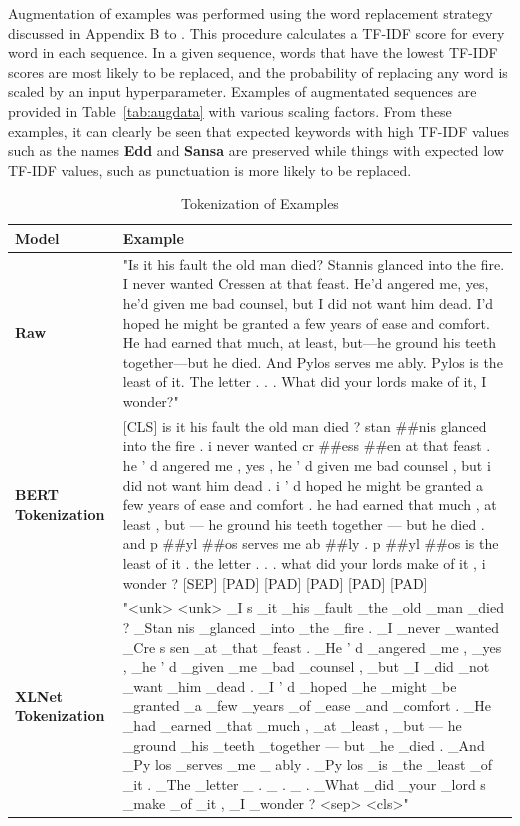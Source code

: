 \documentclass[twoside,twocolumn,10pt]{article}
\begin{document}
Augmentation of examples was performed using the word replacement strategy discussed in Appendix B to \cite{Xie:2019}.  This procedure calculates a TF-IDF score for every word in each sequence. In a given sequence, words that have the lowest TF-IDF scores are most likely to be replaced, and the probability of replacing any word is scaled by an input hyperparameter.  Examples of augmentated sequences are provided in Table~\ref{tab:augdata} with various scaling factors. From these examples, it can clearly be seen that expected keywords with high TF-IDF values such as the names \textbf{Edd} and \textbf{Sansa} are preserved while things with expected low TF-IDF values, such as punctuation is more likely to be replaced.  

\begin{table}[t]
	\small
	\caption{Tokenization of Examples}\label{tab:tokens}
	\centering
		\begin{tabular}{R{3.0cm}| p{11cm}}
			\toprule
			\textbf{Model} & \textbf{Example} \\
			\midrule
			\textbf{Raw}  & "Is it his fault the old man died? Stannis glanced into the fire.  I never wanted Cressen at that feast. He’d angered me, yes, he’d given me bad counsel, but I did not want him dead.  I’d hoped he might be granted a few years of ease and comfort. He had earned that much, at least, but—he ground his teeth together—but he died. And Pylos serves me ably.  Pylos is the least of it. The letter . . . What did your lords make of it, I wonder?"\\
			\textbf{BERT Tokenization}  &   [CLS] is it his fault the old man died ? stan \#\#nis glanced into the fire . i never wanted cr \#\#ess \#\#en at that feast . he ’ d angered me , yes , he ’ d given me bad counsel , but i did not want him dead . i ’ d hoped he might be granted a few years of ease and comfort . he had earned that much , at least , but — he ground his teeth together — but he died . and p \#\#yl \#\#os serves me ab \#\#ly . p \#\#yl \#\#os is the least of it . the letter . . . what did your lords make of it , i wonder ? [SEP] [PAD] [PAD] [PAD] [PAD] [PAD]\\
			\textbf{XLNet Tokenization}  &  "<unk> <unk> \_I s \_it \_his \_fault \_the \_old \_man \_died ? \_Stan nis \_glanced \_into \_the \_fire . \_I \_never \_wanted \_Cre s sen \_at \_that \_feast . \_He ’ d \_angered \_me , \_yes , \_he ’ d \_given \_me \_bad \_counsel , \_but \_I \_did \_not \_want \_him \_dead . \_I ’ d \_hoped \_he \_might \_be \_granted \_a \_few \_years \_of \_ease \_and \_comfort . \_He \_had \_earned \_that \_much , \_at \_least , \_but — he \_ground \_his \_teeth \_together — but \_he \_died . \_And \_Py los \_serves \_me \_ ably . \_Py los \_is \_the \_least \_of \_it . \_The \_letter \_ . \_ . \_ . \_What \_did \_your \_lord s \_make \_of \_it , \_I \_wonder ? <sep> <cls>"\\
			\bottomrule
		\end{tabular}
\end{table} 
\end{document}
